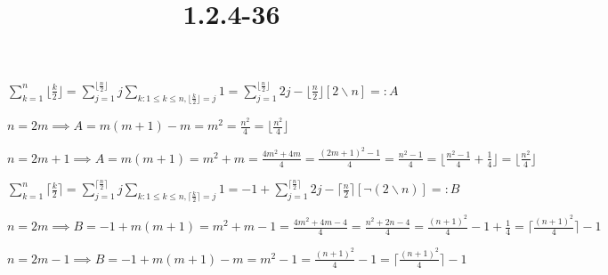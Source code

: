 \documentclass{article}
\title{1.2.4-36}
\begin{document}
\maketitle

$\sum_{k=1}^n \lfloor \frac{k}{2} \rfloor = \sum_{j=1}^{\lfloor\frac{n}{2}\rfloor} j \sum_{k:1 \leq k \leq n, \lfloor \frac{k}{2} \rfloor = j} 1 = \sum_{j=1}^{\lfloor\frac{n}{2}\rfloor} 2j - \lfloor\frac{n}{2} \rfloor [2 \backslash n] =: A$

$n = 2m \implies A = m(m+1) - m = m^2 = \frac{n^2}{4} = \lfloor \frac{n^2}{4} \rfloor$

$n = 2m + 1 \implies A = m(m+1) = m^2 + m = \frac{4m^2+4m}{4} = \frac{(2m+1)^2-1}{4} = \frac{n^2-1}{4} = \lfloor \frac{n^2-1}{4} + \frac{1}{4} \rfloor =  \lfloor \frac{n^2}{4} \rfloor$

$\sum_{k=1}^n \lceil \frac{k}{2} \rceil = \sum_{j=1}^{\lceil\frac{n}{2}\rceil} j \sum_{k:1 \leq k \leq n, \lceil \frac{k}{2} \rceil = j} 1 = -1 + \sum_{j=1}^{\lceil\frac{n}{2}\rceil} 2j - \lceil\frac{n}{2} \rceil [\lnot(2 \backslash n)] =: B$

$n = 2m \implies B = -1 + m(m+1) = m^2+m-1 = \frac{4m^2+4m-4}{4} = \frac{n^2+2n-4}{4} = \frac{(n+1)^2}{4} - 1 + \frac{1}{4} = \lceil \frac{(n+1)^2}{4} \rceil - 1$

$n = 2m-1 \implies B = -1 + m(m+1) - m = m^2 - 1 = \frac{(n+1)^2}{4} - 1 = \lceil \frac{(n+1)^2}{4} \rceil - 1$
\end{document}
